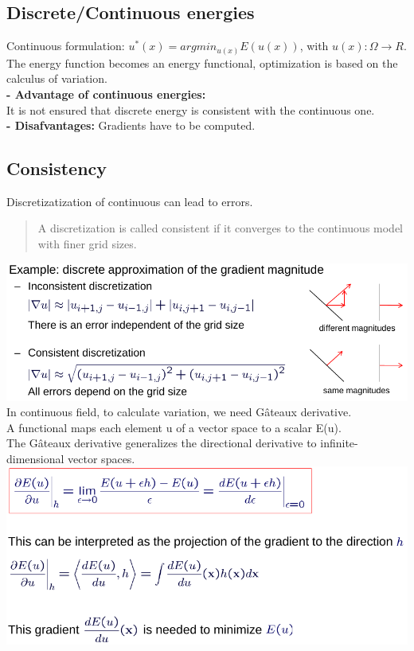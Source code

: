 \documentclass{article}
\begin{document}
\subsection{Discrete/Continuous energies}
Continuous formulation: $u^*(x)=argmin_{u(x)}E(u(x))$, with $u(x):\Omega \rightarrow R$.\\
The energy function becomes an energy functional, optimization is based on the calculus of variation. \\
\textbf{- Advantage of continuous energies:}\\
It is not ensured that discrete energy is consistent with the continuous one. \\
\textbf{- Disafvantages: } Gradients have to be computed.
\subsection{Consistency}
Discretizatization of continuous can lead to errors. \\
\begin{quote}
A discretization is called consistent if it converges to the continuous model with finer grid sizes.
\end{quote}
\includegraphics[scale=0.3]{38.png}\\
In continuous field, to calculate variation, we need Gâteaux derivative.\\
A functional maps each element u of a vector space to a scalar E(u).\\
The Gâteaux derivative generalizes the directional derivative to infinite-dimensional vector spaces.\\
\includegraphics[scale=0.3]{39.png}\\\\
\end{document}
